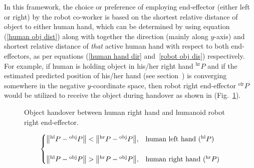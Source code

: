 In this framework, the choice or preference of employing end-effector (either left or right) by the robot co-worker is based on the shortest relative distance of object to either human hand, which can be determined by using equation (\ref{human obj dist}) along with together the direction (mainly along $y$-axis) and shortest relative distance of \textit{that} active human hand with respect to both end-effectors, as per equations (\ref{human hand dir} and~\ref{robot obj dis}) respectively. For example, if human is holding object in his/her right hand ${}^\text{hr}{P}$ and if the estimated predicted position of his/her hand (see section~) is converging somewhere in the negative $y$-coordinate space, then robot right end-effector ${}^\text{efr}{P}$ would be utilized to receive the object during handover as shown in (Fig.~\ref{fig:hr-to-rr}).


\begin{figure}[hpt]
	\caption{Object handover between human right hand and humanoid robot right end-effector.}
	\label{fig:hr-to-rr}
\end{figure}


\begin{equation}\label{human obj dist}
\centering
\begin{cases}
	\norm{{}^\text{hl}{P} - {}^\text{obj}{P}} < \norm{{}^\text{hr}{P} - {}^\text{obj}{P}}, & \text{human left hand (${}^\text{hl}{P}$)}  \\
	\\
	\norm{{}^\text{hl}{P} - {}^\text{obj}{P}} > \norm{{}^\text{hr}{P} - {}^\text{obj}{P}}, & \text{human right hand (${}^\text{hr}{P}$)}
\end{cases}         
\end{equation}


